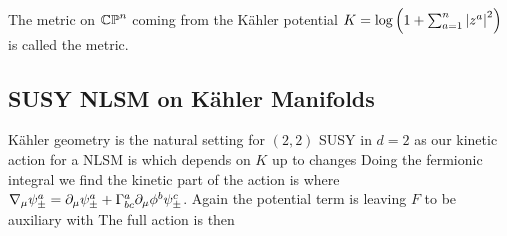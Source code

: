 \documentclass{article}
\begin{document}
\begin{definition}
	The metric on $\mathbb{CP}^n$ coming from the K\"ahler potential $K = \log \left( 1+\sum_{a=1}^n \left\lvert z^a \right\rvert^2 \right)$ is called the  metric.
\end{definition}

\subsection{SUSY NLSM on K\"ahler Manifolds}
K\"ahler geometry is the natural setting for $(2,2)$ SUSY in $d=2$ as our kinetic action for a NLSM is 
which depends on $K$ up to changes 
Doing the fermionic integral we find the kinetic part of the action is 
where $\nabla_\mu \psi_\pm^a = \partial_\mu \psi^a_\pm + \Gamma^a_{bc} \partial_\mu \phi^b \psi^c_\pm$. Again the potential term is 
leaving $F$ to be auxiliary with 
The full action is then 
\end{document}
